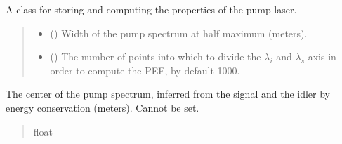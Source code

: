 \documentclass[a4paper,10pt,english]{sphinxmanual}
\begin{document}
\begin{fulllineitems}
\label{\detokenize{pump:pyjsa.pump.Pump}}
\pysigstartsignatures
{}
\pysigstopsignatures
\sphinxAtStartPar
A class for storing and computing the properties of the pump laser.
\begin{quote}\begin{description}
\begin{itemize}
\item {} 
\sphinxAtStartPar
{} () \textendash{} Width of the pump spectrum at half maximum (meters).

\item {} 
\sphinxAtStartPar
{} (\sphinxstyleliteralemphasis{\sphinxupquote{, }}) \textendash{} The number of points into which to divide the \(\lambda_i\) and \(\lambda_s\) axis in order to compute the PEF, by default 1000.

\end{itemize}

\end{description}\end{quote}

\begin{fulllineitems}
\label{\detokenize{pump:pyjsa.pump.Pump.center}}
\pysigstartsignatures
{}
\pysigstopsignatures
\sphinxAtStartPar
The center of the pump spectrum, inferred from the signal and the idler by energy conservation (meters). Cannot be set.
\begin{quote}\begin{description}
\sphinxAtStartPar
float

\end{description}\end{quote}

\end{fulllineitems}


\end{fulllineitems}
\end{document}
